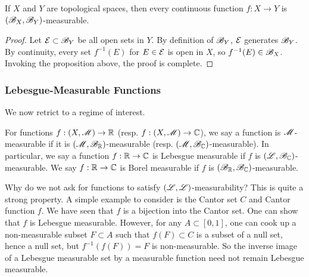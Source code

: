 \documentclass[12pt]{article} %
\begin{document}
\begin{corollary}
    If $X$ and $Y$ are topological spaces, then every continuous function $f : X \to Y$ is $(\mathscr{B}_X, \mathscr{B}_Y)$-measurable.
\end{corollary}

\begin{proof}
    Let $\mathcal{E} \subset \mathscr{B}_Y$ be all open sets in $Y$. By definition of $\mathscr{B}_Y$, $\mathcal{E}$ generates $\mathscr{B}_Y$. By continuity, every set $f^{-1}(E)$ for $E \in \mathcal{E}$ is open in $X$, so $f^{-1}(E) \in \mathscr{B}_X$. Invoking the proposition above, the proof is complete.
\end{proof}

\subsubsection{Lebesgue-Measurable Functions}

We now retrict to a regime of interest.

\begin{definition}
    For functions $f : (X, \mathscr{M}) \to \mathbb{R}$ (resp. $f : (X, \mathscr{M}) \to \mathbb{C}$), we say a function is $\mathscr{M}$-measurable if it is $(\mathscr{M}, \mathscr{B}_{\mathbb{R}})$-measurable (resp. $(\mathscr{M}, \mathscr{B}_{\mathbb{C}})$-measurable). In particular, we say a function $f : \mathbb{R} \to \mathbb{C}$ is Lebesgue measurable if $f$ is $(\mathscr{L}, \mathscr{B}_{\mathbb{C}})$-measurable. We say $f : \mathbb{R} \to \mathbb{C}$ is Borel measurable if $f$ is $(\mathscr{B}_{\mathbb{R}}, \mathscr{B}_{\mathbb{C}})$-measurable.
\end{definition}


\begin{remark}
    Why do we not ask for functions to satisfy $(\mathscr{L}, \mathscr{L})$-measurability? This is quite a strong property. A simple example to consider is the Cantor set $C$ and Cantor function $f$. We have seen that $f$ is a bijection into the Cantor set. One can show that $f$ is Lebesgue measurable. However, for any $A \subset [0,1]$, one can cook up a non-measurable subset $F \subset A$ such that $f(F) \subset C$ is a subset of a null set, hence a null set, but $f^{-1}(f(F)) = F$ is non-measurable. So the inverse image of a Lebesgue measurable set by a measurable function need not remain Lebesgue measurable.
\end{remark}
\end{document}
